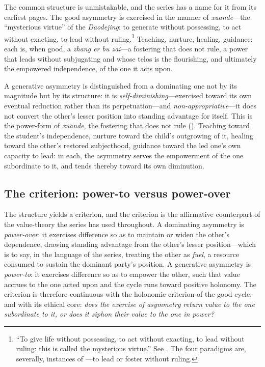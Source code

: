 The common structure is unmistakable, and the series has a name for it from its earliest pages. The good asymmetry is exercised in the manner of \emph{xuande}---the ``mysterious virtue'' of the \emph{Daodejing}: to generate without possessing, to act without exacting, to lead without ruling.\footnote{ ``To give life without possessing, to act without exacting, to lead without ruling: this is called the mysterious virtue.'' See \textcite{laozi1963}. The four paradigms are, severally, instances of ---to lead or foster without ruling.} Teaching, nurture, healing, guidance: each is, when good, a \emph{zhang er bu zai}---a fostering that does not rule, a power that leads without subjugating and whose telos is the flourishing, and ultimately the empowered independence, of the one it acts upon.

\begin{claim}
A generative asymmetry is distinguished from a dominating one not by its magnitude but by its structure: it is \emph{self-diminishing}---exercised toward its own eventual reduction rather than its perpetuation---and \emph{non-appropriative}---it does not convert the other's lesser position into standing advantage for itself. This is the power-form of \emph{xuande}, the fostering that does not rule (). Teaching toward the student's independence, nurture toward the child's outgrowing of it, healing toward the other's restored subjecthood, guidance toward the led one's own capacity to lead: in each, the asymmetry serves the empowerment of the one subordinate to it, and tends thereby toward its own diminution.
\end{claim}

\subsection{The criterion: power-to versus power-over}
\label{p17:sub:asymmetry-criterion}

The structure yields a criterion, and the criterion is the affirmative counterpart of the value-theory the series has used throughout. A dominating asymmetry is \emph{power-over}: it exercises difference so as to maintain or widen the other's dependence, drawing standing advantage from the other's lesser position---which is to say, in the language of the series, treating the other as \emph{fuel}, a resource consumed to sustain the dominant party's position. A generative asymmetry is \emph{power-to}: it exercises difference so as to empower the other, such that value accrues to the one acted upon and the cycle runs toward positive holonomy. The criterion is therefore continuous with the holonomic criterion of the good cycle, and with its ethical core: \emph{does the exercise of asymmetry return value to the one subordinate to it, or does it siphon their value to the one in power?}

